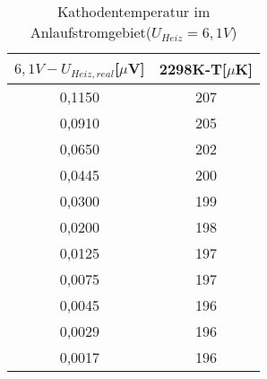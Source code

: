 \begin{table}[h]
	\begin{center}
		\begin{tabular}{cc}
			$6{,}1V-U_{Heiz,real}$[$\mu$V]&2298K-T[$\mu$K] \\ \hline
			0,1150&207 \\
			0,0910&205\\
			0,0650&202\\
			0,0445&200\\
			0,0300&199\\
			0,0200&198\\
			0,0125&197\\
			0,0075&197\\
			0,0045&196\\
			0,0029&196\\
			0,0017&196
		\end{tabular}
		\caption{Kathodentemperatur im Anlaufstromgebiet($U_{Heiz}=6,1V$)}
		\label{tabc1}
	\end{center}
\end{table}